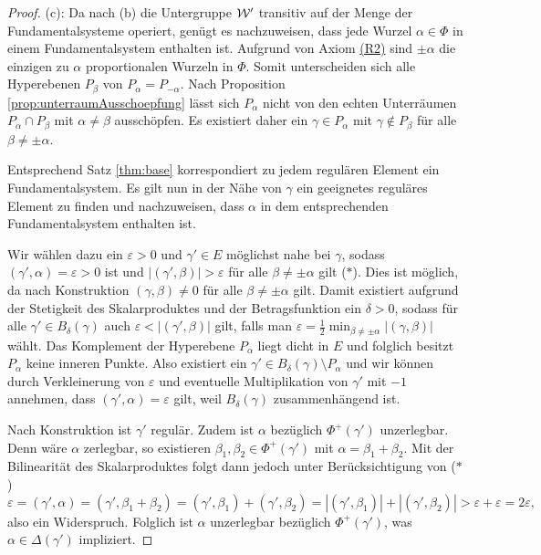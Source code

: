 \begin{proof}
  (c):
  Da nach (b) die Untergruppe $\mathcal{W}'$ transitiv auf der Menge der Fundamentalsysteme operiert, genügt es nachzuweisen, dass jede Wurzel $\alpha \in \Phi$ in einem Fundamentalsystem enthalten ist.
  Aufgrund von Axiom \hyperref[it:R2]{(R2)} sind $\pm \alpha$ die einzigen zu $\alpha$ proportionalen Wurzeln in $\Phi$.
  Somit unterscheiden sich alle Hyperebenen $P_\beta$ von $P_\alpha = P_{-\alpha}$.
  Nach Proposition \ref{prop:unterraumAusschoepfung} lässt sich $P_\alpha$ nicht von den echten Unterräumen $P_\alpha \cap P_\beta$ mit $\alpha \neq \beta$ ausschöpfen.
  Es existiert daher ein $\gamma \in P_\alpha$ mit $\gamma \not\in P_\beta$ für alle $\beta \neq \pm\alpha$.

  Entsprechend Satz \ref{thm:base} korrespondiert zu jedem regulären Element ein Fundamentalsystem. 
  Es gilt nun in der Nähe von $\gamma$ ein geeignetes reguläres Element zu finden und nachzuweisen, dass $\alpha$ in dem entsprechenden Fundamentalsystem enthalten ist.

  Wir wählen dazu ein $\varepsilon > 0$ und $\gamma' \in E$ möglichst nahe bei $\gamma$, sodass $(\gamma', \alpha) = \varepsilon > 0$ ist und $|(\gamma', \beta)| > \varepsilon$ für alle $\beta \neq \pm \alpha$ gilt ($\ast$).
  Dies ist möglich, da nach Konstruktion $(\gamma, \beta) \neq 0$ für alle $\beta \neq \pm \alpha$ gilt.
  Damit existiert aufgrund der Stetigkeit des Skalarproduktes und der Betragsfunktion ein $\delta > 0$, sodass für alle $\gamma' \in B_\delta(\gamma)$ auch $\varepsilon < |(\gamma', \beta)|$ gilt, falls man $\varepsilon = \tfrac{1}{2} \min_{\beta \neq \pm\alpha}{|(\gamma,\beta)|}$ wählt.
  Das Komplement der Hyperebene $P_\alpha$ liegt dicht in $E$ und folglich besitzt $P_\alpha$ keine inneren Punkte.
  Also existiert ein $\gamma' \in B_\delta(\gamma) \setminus P_\alpha$ und wir können durch Verkleinerung von $\varepsilon$ und eventuelle Multiplikation von $\gamma'$ mit $-1$ annehmen, dass $(\gamma', \alpha) = \varepsilon$ gilt, weil $B_\delta(\gamma)$ zusammenhängend ist.

  Nach Konstruktion ist $\gamma'$ regulär.
  Zudem ist $\alpha$ bezüglich $\Phi^+(\gamma')$ unzerlegbar.
  Denn wäre $\alpha$ zerlegbar, so existieren $\beta_1, \beta_2 \in \Phi^+(\gamma')$ mit $\alpha = \beta_1 + \beta_2$.
  Mit der Bilinearität des Skalarproduktes folgt dann jedoch unter Berücksichtigung von ($\ast$)
  \begin{displaymath}
    \varepsilon 
    = (\gamma', \alpha) 
    = (\gamma', \beta_1 + \beta_2) 
    = (\gamma', \beta_1) + (\gamma', \beta_2)
    = |(\gamma', \beta_1)| + |(\gamma', \beta_2)|
    > \varepsilon + \varepsilon
    = 2\varepsilon,
  \end{displaymath}
  also ein Widerspruch.
  Folglich ist $\alpha$ unzerlegbar bezüglich $\Phi^+(\gamma')$, was $\alpha \in \Delta(\gamma')$ impliziert.


\end{proof}
